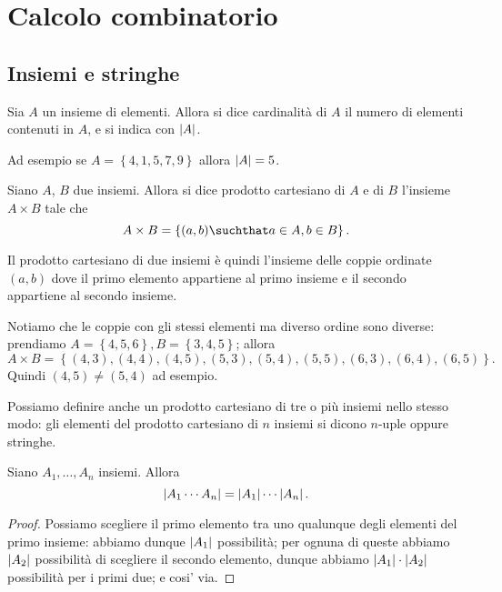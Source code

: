 \chapter{Calcolo combinatorio}

\section{Insiemi e stringhe}

\begin{definition}
    Sia $A$ un insieme di elementi. Allora si dice cardinalità di $A$ il numero di elementi contenuti in $A$, e si indica con $\left|A\right|$.
\end{definition}
Ad esempio se $A = \left\{ 4, 1, 5, 7, 9\right\}$ allora $\left|A\right| = 5$.

\begin{definition}
    Siano $A$, $B$ due insiemi. Allora si dice prodotto cartesiano di $A$ e di $B$ l'insieme $A \times B$ tale che \[
        A \times B = \left\{ (a, b) \suchthat a \in A, b \in B\right\}   
    .\]
\end{definition}
Il prodotto cartesiano di due insiemi è quindi l'insieme delle coppie ordinate $(a, b)$ dove il primo elemento appartiene al primo insieme e il secondo appartiene al secondo insieme. 

Notiamo che le coppie con gli stessi elementi ma diverso ordine sono diverse: prendiamo $A = \left\{ 4, 5, 6 \right\}, B = \left\{ 3, 4, 5 \right\}$; allora \[
    A \times B = \left\{ (4, 3), (4, 4), (4, 5), (5, 3), (5, 4), (5, 5), (6, 3), (6, 4), (6, 5)\right\}   
.\] Quindi $(4, 5) \neq (5, 4)$ ad esempio.

Possiamo definire anche un prodotto cartesiano di tre o più insiemi nello stesso modo: gli elementi del prodotto cartesiano di $n$ insiemi si dicono $n$-uple oppure stringhe.

\begin{proposition}\label{cardinalita_prodotto_cartesiano}
    Siano $A_1, \dots, A_n$ insiemi. Allora \begin{equation}
        \left|A_1 \cdots A_n\right| = \left|A_1\right| \cdots \left|A_n\right|.
    \end{equation}
\end{proposition}
\begin{proof}
    Possiamo scegliere il primo elemento tra uno qualunque degli elementi del primo insieme: abbiamo dunque $\left|A_1\right|$ possibilità; per ognuna di queste abbiamo $\left|A_2\right|$ possibilità di scegliere il secondo elemento, dunque abbiamo $\left|A_1\right| \cdot \left|A_2\right|$ possibilità per i primi due; e cosi' via.
\end{proof}

